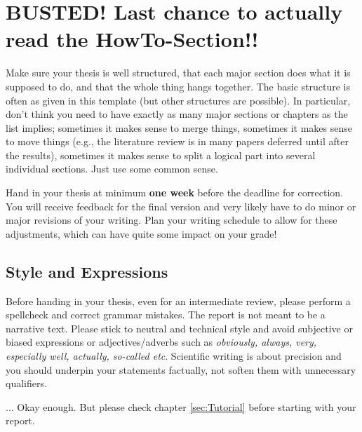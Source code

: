 \ifLSRITRtutorial
	\chapter{BUSTED! Last chance to actually read the HowTo-Section!!}
	
	Make sure your thesis is well structured, that each major section does what it is supposed to do, and that the whole thing hangs together. The basic structure is often as given in this template (but other structures are possible). In particular, don't think you need to have exactly as many major sections or chapters as the list implies; sometimes it makes sense to merge things, sometimes it makes sense to move things (e.g., the literature review is in many papers deferred until after the results), sometimes it makes sense to split a logical part into several individual sections. Just use some common sense.
	
	Hand in your thesis at minimum \textbf{one week} before the deadline for correction. You will receive feedback for the final version and very likely have to do minor or major revisions of your writing. Plan your writing schedule to allow for these adjustments, which can have quite some impact on your grade! 
	
	
	\section{Style and Expressions}
	
	Before handing in your thesis, even for an intermediate review, please perform a spellcheck and correct grammar mistakes. The report is not meant to be a narrative text. Please stick to neutral and technical style and avoid subjective or biased expressions or adjectives/adverbs such as \emph{obviously, always, very, especially well, actually, so-called etc}. Scientific writing is about precision and you should underpin your statements factually, not soften them with unnecessary qualifiers.
	
	... Okay enough. But please check chapter \ref{sec:Tutorial} before starting with your report. 
\fi